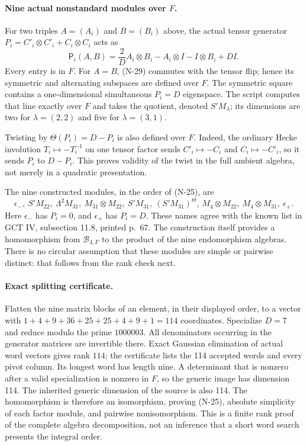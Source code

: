 \paragraph{Nine actual nonstandard modules over $F$.}
For two triples $A=(A_i)$ and $B=(B_i)$ above, the actual tensor
generator $P_i=C'_i\otimes C'_i+C_i\otimes C_i$ acts as
\[
 \mathsf P_i(A,B)=\frac{2}{D}A_i\otimes B_i
              -A_i\otimes I-I\otimes B_i+D I.
 \tag{N-29}
\]
Every entry is in $F$.  For $A=B$, (N-29) commutes with the tensor flip;
hence its symmetric and alternating subspaces are defined over $F$.
The symmetric square contains a one-dimensional simultaneous
$P_i=D$ eigenspace.  The script computes that line exactly over $F$
and takes the quotient, denoted $S'M_{\lambda}$; its dimensions are
two for $\lambda=(2,2)$ and five for $\lambda=(3,1)$.

Twisting by $\Theta(P_i)=D-P_i$ is also defined over $F$.
Indeed, the ordinary Hecke involution $T_i\mapsto-T_i^{-1}$ on one
tensor factor sends $C'_i\mapsto-C_i$ and $C_i\mapsto-C'_i$, so it
sends $P_i$ to $D-P_i$.  This proves validity of the twist in the
full ambient algebra, not merely in a quadratic presentation.

The nine constructed modules, in the order of (N-25), are
\[
 \epsilon_-,\ S'M_{22},\ \Lambda^2M_{31},\ M_{31}\otimes M_{22},\
 S'M_{31},\ (S'M_{31})^\Theta,\ M_4\otimes M_{22},\
 M_4\otimes M_{31},\ \epsilon_+.
 \tag{N-30}
\]
Here $\epsilon_-$ has $P_i=0$, and $\epsilon_+$ has $P_i=D$.
These names agree with the known list in GCT IV, subsection 11.8,
printed p.~67.  The construction itself provides a homomorphism
from $\mathcal B_{4,F}$ to the product of the nine endomorphism
algebras.  There is no circular assumption that these modules are
simple or pairwise distinct: that follows from the rank check next.

\paragraph{Exact splitting certificate.}
Flatten the nine matrix blocks of an element, in their displayed order,
to a vector with $1+4+9+36+25+25+4+9+1=114$ coordinates.  Specialize
$D=7$ and reduce modulo the prime $1000003$.  All denominators occurring
in the generator matrices are invertible there.  Exact Gaussian
elimination of actual word vectors gives rank $114$; the certificate
lists the 114 accepted words and every pivot column.  Its longest word
has length nine.  A determinant that is nonzero after a valid
specialization is nonzero in $F$, so the generic image has dimension
114.  The inherited generic dimension of the source is also 114.
The homomorphism is therefore an isomorphism, proving (N-25), absolute
simplicity of each factor module, and pairwise nonisomorphism.
This is a finite rank proof of the complete algebra decomposition,
not an inference that a short word search presents the integral order.

